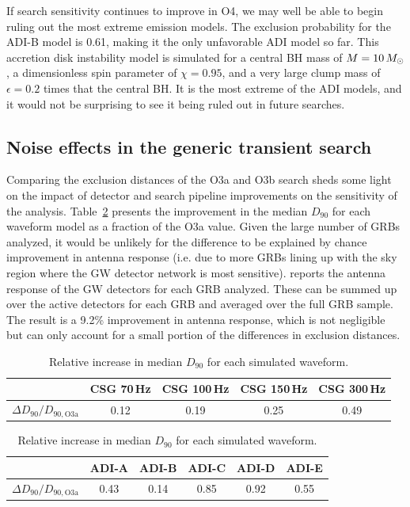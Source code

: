 If search sensitivity continues to improve in \ac{O4}, we may well be able to begin ruling out the most extreme emission models.
The exclusion probability for the ADI-B model is 0.61, making it the only unfavorable ADI model so far.
This accretion disk instability model is simulated for a central \ac{BH} mass of $M=10\,M_{\odot}$, a dimensionless spin parameter of $\chi=0.95$, and a very large clump mass of $\epsilon=0.2$ times that the central \ac{BH}.
It is the most extreme of the ADI models, and it would not be surprising to see it being ruled out in future searches.


\subsection{Noise effects in the generic transient search}\label{sec:grb-o3b-noise}

Comparing the exclusion distances of the O3a and O3b search sheds some light on the impact of detector and search pipeline improvements on the sensitivity of the \xpip analysis.
Table~\ref{tab:grb-o3b-compare-o3a} presents the improvement in the median $D_{90}$ for each waveform model as a fraction of the O3a value.
Given the large number of GRBs analyzed, it would be unlikely for the difference to be explained by chance improvement in antenna response (i.e. due to more GRBs lining up with the sky region where the GW detector network is most sensitive).
\xpip reports the antenna response of the GW detectors for each GRB analyzed.
These can be summed up over the active detectors for each GRB and averaged over the full GRB sample.
The result is a 9.2\% improvement in antenna response, which is not negligible but can only account for a small portion of the differences in exclusion distances.

\begin{table}[h]
  \hspace{0.5cm}
  \caption
  {\label{tab:grb-o3b-compare-o3a} Relative increase in median $D_{90}$ for each \xpip simulated waveform.}
  \begin{tabular}{c c c c c}
    \hline
    \hline
    \rule{0pt}{4ex}
    & CSG 70\,Hz & CSG 100\,Hz & CSG 150\,Hz & CSG 300\,Hz \\
    \hline
    \rule[-2ex]{0pt}{4ex}
		$\Delta D_{90} / D_{90, \text{O3a}}$ & 0.12 & 0.19 & 0.25 & 0.49
  \end{tabular}
  \begin{tabular}{c c c c c c}
    \hline
    \hline
    \rule{0pt}{4ex}
    & ADI-A & ADI-B & ADI-C & ADI-D & ADI-E \\
    \hline
    \rule[-2ex]{0pt}{4ex}
    $\Delta D_{90} / D_{90, \text{O3a}}$ & 0.43 & 0.14 & 0.85 & 0.92 & 0.55 \\
    \hline
  \end{tabular}
\end{table}

